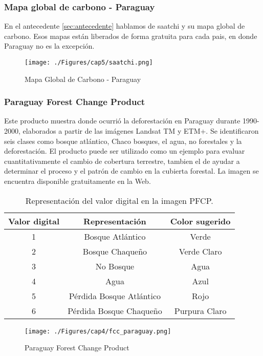 \subsubsection{Mapa global de carbono - Paraguay}\label{sec:saatchiMapa}
En el antecedente \ref{sec:antecedente} hablamos de saatchi y su mapa global de carbono. Esos mapas están liberados de forma gratuita para cada pais, en donde Paraguay no es la excepción.
\begin{figure}[H]
	\centering
	\texttt{[image: ./Figures/cap5/saatchi.png]}
	\caption{Mapa Global de Carbono - Paraguay}
	\label{fig:saatchi}
\end{figure}


\subsubsection{Paraguay Forest Change Product}\label{sec:fcc}
Este producto muestra donde ocurri\'o la deforestaci\'on en Paraguay durante 1990-2000, elaborados a partir de las im\'agenes Landsat TM y ETM+. Se identificaron seis clases como bosque atl\'antico, Chaco bosques, el agua, no forestales y la deforestaci\'on. El producto puede ser utilizado como un ejemplo para evaluar cuantitativamente el cambio de cobertura terrestre, tambien el de ayudar a determinar el proceso y el patr\'on de cambio en la cubierta forestal. La imagen se encuentra disponible gratuitamente en la Web\cite{gl2015Uni}.
\begin{table}[htbp]\centering
\begin{tabular}{|c|c|c|}
	\hline \textbf{Valor digital} &\textbf{ Representaci\'on} & \textbf{Color sugerido} \\ 
	\hline 1 & Bosque Atl\'antico & Verde \\ 
	\hline 2 & Bosque Chaque\~{n}o & Verde Claro \\ 
	\hline 3 & No Bosque & Agua \\ 
	\hline 4 & Agua & Azul \\ 
	\hline 5 & P\'erdida Bosque Atl\'antico & Rojo \\ 
	\hline 6 & P\'erdida Bosque Chaque\~{n}o & Purpura Claro \\ 
	\hline 
\end{tabular} 
\caption{Representaci\'on del valor digital en la imagen PFCP.}
\end{table}

\begin{figure}[H]
	\centering
	\texttt{[image: ./Figures/cap4/fcc\_paraguay.png]}
	\caption{Paraguay Forest Change Product}
	\label{fig:fcc}
\end{figure}



